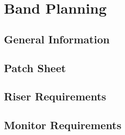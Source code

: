 \section{Band Planning}
    \subsection{General Information}

    \subsection{Patch Sheet}

    \subsection{Riser Requirements}

    \subsection{Monitor Requirements}